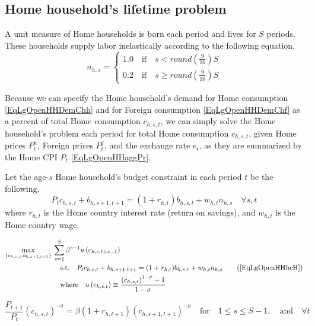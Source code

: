 \documentclass[letterpaper,12pt]{article}
\theoremstyle{definition}
\begin{document}
  \subsection{Home household's lifetime problem}\label{SecLgOpenHHlifeH}

    A unit measure of Home households is born each period and lives for $S$ periods. These households supply labor inelastically according to the following equation.
    \begin{equation}\label{EqLgOpenHHlabH}
      n_{h,s} =
        \begin{cases}
          1.0 \quad\text{if}\quad s < round\left(\frac{9}{16}\right)S \\
          0.2 \quad\text{if}\quad s \geq round\left(\frac{9}{16}\right)S
        \end{cases}
    \end{equation}

    Because we can specify the Home household's demand for Home consumption \eqref{EqLgOpenHHDemChh} and for Foreign consumption \eqref{EqLgOpenHHDemChf} as a percent of total Home consumption $c_{h,s,t}$, we can simply solve the Home household's problem each period for total Home consumption $c_{h,s,t}$, given Home prices $P^h_t$, Foreign prices $P^f_t$, and the exchange rate $e_t$, as they are summarized by the Home CPI $P_t$ \eqref{EqLgOpenHHaggPr}.

    Let the age-$s$ Home household's budget constraint in each period $t$ be the following,
    \begin{equation}\label{EqLgOpenHHbcH}
      P_t c_{h,s,t} + b_{h,s+1,t+1} = (1 + r_{h,t})b_{h,s,t} + w_{h,t}n_{h,s} \quad\forall s, t
    \end{equation}
    where $r_{h,t}$ is the Home country interest rate (return on savings), and $w_{h,t}$ is the Home country wage.

    \begin{align}
      \max_{\{c_{h,s,t},b_{h,s+1,t+1}\}}\: &\sum_{s=1}^S \beta^{s-1}u\left(c_{h,s,t+s-1}\right) \label{EqLgOpenHHmaxprobH} \\
      &\quad\text{s.t.}\quad P_t c_{h,s,t} + b_{h,s+1,t+1} = (1 + r_{h,t})b_{h,s,t} + w_{h,t}n_{h,s} \tag{\ref{EqLgOpenHHbcH}} \\
      &\quad\text{where}\quad u\left(c_{h,s,t}\right) \equiv \frac{\left(c_{h,s,t}\right)^{1-\sigma} - 1}{1 - \sigma}
    \end{align}

    \begin{equation}\label{EqLgOpenHHeul_bH}
      \frac{P_{t+1}}{P_t}\left(c_{h,s,t}\right)^{-\sigma} = \beta(1 + r_{h,t+1})\left(c_{h,s+1,t+1}\right)^{-\sigma} \quad\text{for}\quad 1\leq s\leq S-1,\quad\text{and}\quad\forall t
    \end{equation}
\end{document}
